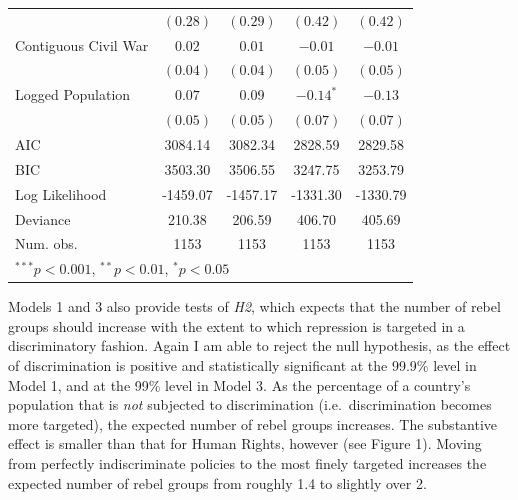 \documentclass[12pt,]{book}
\let\origtable\table
\let\endorigtable\endtable
\renewenvironment{table}[1][2] {
    \singlespacing
    \expandafter\origtable\expandafter[H]
} {
    \endorigtable
}
\begin{document}
\begin{table}
\begin{center}
\begin{tabular}{l c c c c }
                                  & $(0.28)$      & $(0.29)$      & $(0.42)$       & $(0.42)$       \\
Contiguous Civil War              & $0.02$        & $0.01$        & $-0.01$        & $-0.01$        \\
                                  & $(0.04)$      & $(0.04)$      & $(0.05)$       & $(0.05)$       \\
Logged Population                 & $0.07$        & $0.09$        & $-0.14^{*}$    & $-0.13$        \\
                                  & $(0.05)$      & $(0.05)$      & $(0.07)$       & $(0.07)$       \\
\hline
AIC                               & 3084.14       & 3082.34       & 2828.59        & 2829.58        \\
BIC                               & 3503.30       & 3506.55       & 3247.75        & 3253.79        \\
Log Likelihood                    & -1459.07      & -1457.17      & -1331.30       & -1330.79       \\
Deviance                          & 210.38        & 206.59        & 406.70         & 405.69         \\
Num. obs.                         & 1153          & 1153          & 1153           & 1153           \\
\hline
\multicolumn{5}{l}{\scriptsize{$^{***}p<0.001$, $^{**}p<0.01$, $^*p<0.05$}}
\end{tabular}
\caption{Poisson Regression Models of Rebel Group Count}
\label{table:coefficients}
\end{center}
\end{table}

Models 1 and 3 also provide tests of \emph{H2}, which expects that the
number of rebel groups should increase with the extent to which
repression is targeted in a discriminatory fashion. Again I am able to
reject the null hypothesis, as the effect of discrimination is positive
and statistically significant at the 99.9\% level in Model 1, and at the
99\% level in Model 3. As the percentage of a country's population that
is \emph{not} subjected to discrimination (i.e.~discrimination becomes
more targeted), the expected number of rebel groups increases. The
substantive effect is smaller than that for Human Rights, however (see
Figure 1). Moving from perfectly indiscriminate policies to the most
finely targeted increases the expected number of rebel groups from
roughly 1.4 to slightly over 2.
\end{document}
